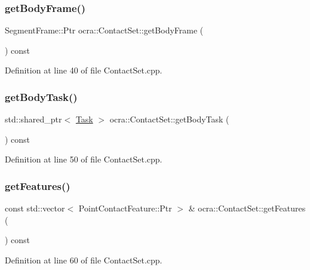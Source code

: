 \subsubsection{\texorpdfstring{get\+Body\+Frame()}{getBodyFrame()}}
{\footnotesize\ttfamily Segment\+Frame\+::\+Ptr ocra\+::\+Contact\+Set\+::get\+Body\+Frame (\begin{DoxyParamCaption}{ }\end{DoxyParamCaption}) const}



Definition at line 40 of file Contact\+Set.\+cpp.

\hypertarget{classocra_1_1ContactSet_a72517a1bde5c4d5e2f686803c9a1fe5d}{}\label{classocra_1_1ContactSet_a72517a1bde5c4d5e2f686803c9a1fe5d} 
\subsubsection{\texorpdfstring{get\+Body\+Task()}{getBodyTask()}}
{\footnotesize\ttfamily std\+::shared\+\_\+ptr$<$ \hyperlink{classocra_1_1Task}{Task} $>$ ocra\+::\+Contact\+Set\+::get\+Body\+Task (\begin{DoxyParamCaption}{ }\end{DoxyParamCaption}) const}



Definition at line 50 of file Contact\+Set.\+cpp.

\hypertarget{classocra_1_1ContactSet_a8f5840a62ab7b1e0c6b938bc4b7b102b}{}\label{classocra_1_1ContactSet_a8f5840a62ab7b1e0c6b938bc4b7b102b} 
\subsubsection{\texorpdfstring{get\+Features()}{getFeatures()}}
{\footnotesize\ttfamily const std\+::vector$<$ Point\+Contact\+Feature\+::\+Ptr $>$ \& ocra\+::\+Contact\+Set\+::get\+Features (\begin{DoxyParamCaption}{ }\end{DoxyParamCaption}) const}



Definition at line 60 of file Contact\+Set.\+cpp.

\hypertarget{classocra_1_1ContactSet_a7f16dde129521e94ceb0fb091f5d840f}{}\label{classocra_1_1ContactSet_a7f16dde129521e94ceb0fb091f5d840f} 
